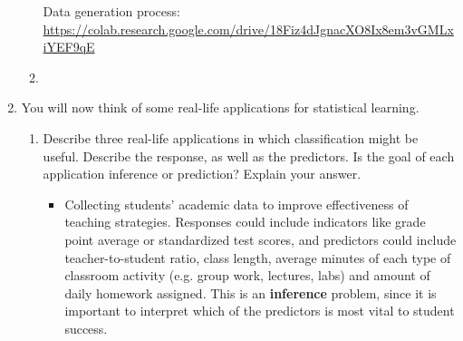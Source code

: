 \documentclass[11pt]{article}
\begin{document}
\begin{enumerate}
\begin{enumerate}
        
        \begin{center}
        \footnotesize Data generation process: \url{https://colab.research.google.com/drive/18Fiz4dJgnacXO8Ix8em3vGMLxiYEF9qE}
        \end{center}
      \item
    \end{enumerate}

  \item You will now think of some real-life applications for
    statistical learning.
    \begin{enumerate}
      \item Describe three real-life applications in which classification might
        be useful. Describe the response, as well as the predictors. Is the
        goal of each application inference or prediction? Explain your
        answer.
        \begin{itemize}
          \item Collecting students' academic data to
            improve effectiveness of teaching strategies. Responses
            could include indicators like grade point average or
            standardized test scores, and predictors could include
            teacher-to-student ratio, class length, average minutes
            of each type of classroom activity (e.g. group work,
            lectures, labs) and amount of daily homework assigned.
            This is an \textbf{inference} problem, since it is
            important to interpret which of the predictors is most
            vital to student success.
        \end{itemize}


\end{enumerate}
\end{enumerate}
\end{document}
